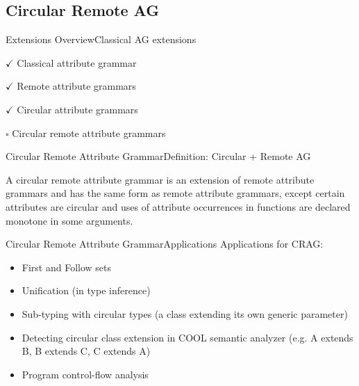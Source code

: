 
\subsection*{Circular Remote AG}{}

\begin{frame}{Extensions Overview}{Classical AG extensions}
     \begin{description}
        \item $\checkmark$ Classical attribute grammar
        \item $\checkmark$  Remote attribute grammars
        \item $\checkmark$ Circular attribute grammars
        \item $\square$   \alert{Circular remote attribute grammars}
    \end{description}
\end{frame}



\begin{frame}{Circular Remote Attribute Grammar}{Definition: Circular + Remote AG}

\begin{definition}
A circular remote attribute grammar is an \alert{extension of remote attribute grammars} and has the same form as remote attribute grammars, except \alert{certain attributes are circular} and \alert{uses of attribute occurrences in functions are declared monotone in some arguments}.
\end{definition}
\end{frame}


\begin{frame}{Circular Remote Attribute Grammar}{Applications}
Applications for CRAG:

\begin{itemize}
    \item First and Follow sets
    \item Unification (in type inference)
	\item Sub-typing with circular types (a class extending its own generic parameter)
	\item Detecting circular class extension in COOL semantic analyzer (e.g. A extends B, B extends C, C extends A)
 \item Program control-flow analysis
\end{itemize}
\end{frame}

